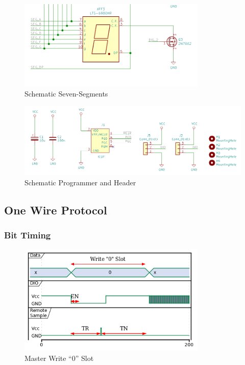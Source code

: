 \begin{figure}[htbp]
\centering
\includegraphics[width=0.80000\textwidth]{documents/images/schematic_seven_segment.png}
\caption{Schematic Seven-Segments\label{schematic_seven_segment}}
\end{figure}

\begin{figure}[htbp]
\centering
\includegraphics[width=1.00000\textwidth]{documents/images/schematic_seven_prog.png}
\caption{Schematic Programmer and Header\label{schematic_seven_prog}}
\end{figure}

\subsection{One Wire Protocol}\label{one-wire-protocol}

\subsubsection{Bit Timing}\label{bit-timing}

\begin{figure}[htbp]
\centering
\includegraphics[width=0.80000\textwidth]{documents/images/bit_timing_0.png}
\caption{Master Write ``0'' Slot\label{bit_timing_0}}
\end{figure}

